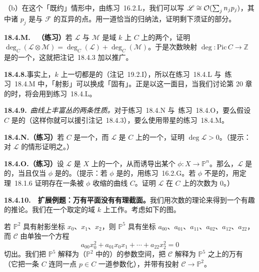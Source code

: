 （b）在这个「既约」情形中，由\mbox{练习~16.2.L}，我们可以写 $\mathscr{L}\cong\mathcal{O}(\sum_j n_jp_j)$，其中诸 $p_j$ 是与 $\mathscr{F}$ 的\trAssociatedPoint{}互异的\trRegular{}点。用一道恰当的归纳法，证明剩下须证的部分。

\textbf{18.4.M.}\ \hard\ \textbf{（练习）}\quad 若 $\mathscr{L}$ 与 $\mathscr{M}$ 是域 $k$ 上\trProjective{}\trCurve{} $C$ 上的两个\trLineBundle，证明 $\deg_C(\mathscr{L}\otimes\mathscr{M})=\deg_C(\mathscr{L})+\deg_C(\mathscr{M})$。于是次数映射 $\deg\colon\mathrm{Pic}\,C\to\mathbb{Z}$ 是\trAbelianGroups{}的一个\trHomomorphism，这就把\mbox{注记~18.4.3} 加以推广。

\textbf{18.4.8.}\quad 事实上，$k$ 上一切\trProper{}\trCurve{}都是\trProjective{}的（\mbox{注记~19.2.I}），所以在\mbox{练习~18.4.L} 与~\mbox{练习~18.4.M} 中，「射影」可以换成「固有」。正是以这一面目，当我们讨论第 20 章的\trIntersectionTheory{}时，将会用到\mbox{练习~18.4.L}。

\textbf{18.4.9.}\ \emph{曲线上丰富丛的两条性质。}\quad 对于\mbox{练习~18.4.N} 与~\mbox{练习~18.4.O}，要么假设 $C$ 是\trRegular{}的（这样你就可以援引\mbox{注记~18.4.3}），要么使用带星的\mbox{练习~18.4.M}。

\textbf{18.4.N.（练习）}\quad 若 $C$ 是一个\trProjective{}\trCurve，而 $\mathscr{L}$ 是 $C$ 上的一个\trAmple\trLineBundle，证明 $\deg\mathscr{L}>0$。（提示：对 $\mathscr{L}$ \emph{\trVeryAmple}的情形证明之。）

\textbf{18.4.O.（练习）}\quad 设 $\mathscr{L}$ 是\trProper{}\trVariety{} $X$ 上的一个\trBasePointFree\trInvertibleSheaf，从而诱导出某个\trMorphism{} $\phi\colon X\to\mathbb{P}^n$。那么，$\mathscr{L}$ 是\trAmple{}的，当且仅当 $\phi$ 是\trFinite{}的。（提示：若 $\phi$ 是\trFinite{}的，用\mbox{练习~16.2.G}。若 $\phi$ 不是\trFinite{}的，用\mbox{定理~18.1.6} 证明存在一条被 $\phi$ 收缩的曲线 $C$。证明 $\mathscr{L}$ 在 $C$ 上的次数为 $0$。）

\textbf{18.4.10.}\ \hard\ \textbf{扩展例题：万有平面\trConic{}没有有理截面。}\quad 我们用次数的理论来得到一个有趣的推论。我们在一个取定的域 $k$ 上工作。考虑如下的图。
若 $\mathbb{P}^2$ 具有射影坐标 $x_0$、$x_1$、$x_2$，则 $\mathbb{P}^5$ 具有坐标 $a_{00}$、$a_{01}$、$a_{11}$、$a_{02}$、$a_{12}$、$a_{22}$，而 $\mathscr{C}$ 由单独一个方程
\[
a_{00}x_0^2+a_{01}x_0x_1+\cdots+a_{22}x_2^2=0
\]
切出。我们把 $\mathbb{P}^5$ 解释为（$\mathbb{P}^2$ 中的）\trConic{}的参数空间，把 $\mathscr{C}$ 解释为 $\mathbb{P}^5$ 之上的万有\trConic（它把一条\trConic{} $C$ 连同一点 $p\in C$ 一道参数化），并带有\trCanonical{}投射 $\mathscr{C}\to\mathbb{P}^2$。

